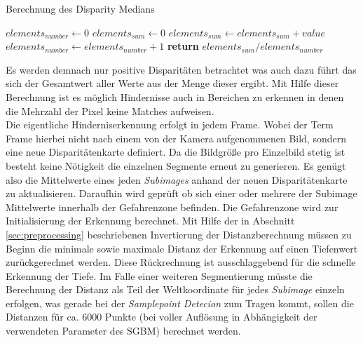 \begin{algorithm}[h]
\caption{Berechnung des Disparity Medians}
\label{alg:mean_disparity_calculation}
\begin{algorithmic}[1]
        \State $elements_{number} \gets 0$
        \State $elements_{sum} \gets 0 $
                \State $elements_{sum} \gets elements_{sum} + value$
                \State $elements_{number} \gets elements_{number} + 1$
            \EndIf
        \EndFor
        \State \textbf{return} $elements_{sum} / elements_{number}$
    \EndProcedure
\end{algorithmic}  
\end{algorithm}

\noindent
Es werden demnach nur positive Disparitäten betrachtet was auch dazu führt das sich der Gesamtwert aller Werte aus der Menge dieser ergibt. Mit Hilfe dieser Berechnung ist es möglich Hindernisse auch in Bereichen zu erkennen in denen die Mehrzahl der Pixel keine Matches aufweisen.\\

\noindent
Die eigentliche Hinderniserkennung erfolgt in jedem Frame. Wobei der Term Frame hierbei nicht nach einem von der Kamera aufgenommenen Bild, sondern eine neue Disparitätenkarte definiert. Da die Bildgröße pro Einzelbild stetig ist besteht keine Nötigkeit die einzelnen Segmente erneut zu generieren. Es genügt also die Mittelwerte eines jeden \emph{Subimages} anhand der neuen Disparitätenkarte zu aktualisieren. Daraufhin wird geprüft ob sich einer oder mehrere der Subimage Mittelwerte innerhalb der Gefahrenzone befinden. Die Gefahrenzone wird zur Initialisierung der Erkennung berechnet. Mit Hilfe der in Abschnitt \ref{sec:preprocessing} beschriebenen Invertierung der Distanzberechnung müssen zu Beginn die minimale sowie maximale Distanz der Erkennung auf einen Tiefenwert zurückgerechnet werden. Diese Rückrechnung ist ausschlaggebend für die schnelle Erkennung der Tiefe. Im Falle einer weiteren Segmentierung müsste die Berechnung der Distanz als Teil der Weltkoordinate für jedes \emph{Subimage} einzeln erfolgen, was gerade bei der \emph{Samplepoint Detecion} zum Tragen kommt, sollen die Distanzen für ca. $6000$ Punkte (bei voller Auflösung in Abhängigkeit der verwendeten Parameter des SGBM) berechnet werden.\\

